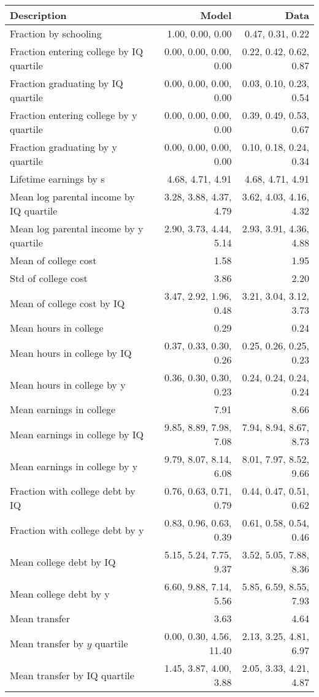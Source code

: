 \begin{tabular}{lrr}
\hline
Description & Model  & Data  \\
\hline
Fraction by schooling & 1.00, 0.00, 0.00  & 0.47, 0.31, 0.22  \\
Fraction entering college by IQ quartile & 0.00, 0.00, 0.00, 0.00  & 0.22, 0.42, 0.62, 0.87  \\
Fraction graduating by IQ quartile & 0.00, 0.00, 0.00, 0.00  & 0.03, 0.10, 0.23, 0.54  \\
Fraction entering college by y quartile & 0.00, 0.00, 0.00, 0.00  & 0.39, 0.49, 0.53, 0.67  \\
Fraction graduating by y quartile & 0.00, 0.00, 0.00, 0.00  & 0.10, 0.18, 0.24, 0.34  \\
Lifetime earnings by s & 4.68, 4.71, 4.91  & 4.68, 4.71, 4.91  \\
Mean log parental income by IQ quartile & 3.28, 3.88, 4.37, 4.79  & 3.62, 4.03, 4.16, 4.32  \\
Mean log parental income by y quartile & 2.90, 3.73, 4.44, 5.14  & 2.93, 3.91, 4.36, 4.88  \\
Mean of college cost & 1.58  & 1.95  \\
Std of college cost & 3.86  & 2.20  \\
Mean of college cost by IQ & 3.47, 2.92, 1.96, 0.48  & 3.21, 3.04, 3.12, 3.73  \\
Mean hours in college & 0.29  & 0.24  \\
Mean hours in college by IQ & 0.37, 0.33, 0.30, 0.26  & 0.25, 0.26, 0.25, 0.23  \\
Mean hours in college by y & 0.36, 0.30, 0.30, 0.23  & 0.24, 0.24, 0.24, 0.24  \\
Mean earnings in college & 7.91  & 8.66  \\
Mean earnings in college by IQ & 9.85, 8.89, 7.98, 7.08  & 7.94, 8.94, 8.67, 8.73  \\
Mean earnings in college by y & 9.79, 8.07, 8.14, 6.08  & 8.01, 7.97, 8.52, 9.66  \\
Fraction with college debt by IQ & 0.76, 0.63, 0.71, 0.79  & 0.44, 0.47, 0.51, 0.62  \\
Fraction with college debt by y & 0.83, 0.96, 0.63, 0.39  & 0.61, 0.58, 0.54, 0.46  \\
Mean college debt by IQ & 5.15, 5.24, 7.75, 9.37  & 3.52, 5.05, 7.88, 8.36  \\
Mean college debt by y & 6.60, 9.88, 7.14, 5.56  & 5.85, 6.59, 8.55, 7.93  \\
Mean transfer & 3.63  & 4.64  \\
Mean transfer by $y$ quartile & 0.00, 0.30, 4.56, 11.40  & 2.13, 3.25, 4.81, 6.97  \\
Mean transfer by IQ quartile & 1.45, 3.87, 4.00, 3.88  & 2.05, 3.33, 4.21, 4.87  \\
\hline
\end{tabular}%
